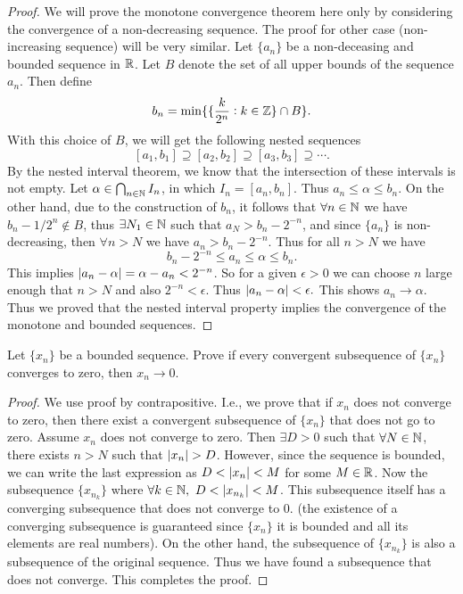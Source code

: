 \begin{proof}
	We will prove the monotone convergence theorem here only by considering the convergence of a non-decreasing sequence. The proof for other case (non-increasing sequence) will be very similar. Let $\{a_n\}$ be a non-deceasing and bounded sequence in $\mathbb{R}$. Let $B$ denote the set of all upper bounds of the sequence $a_n$. Then define
	\[ b_n = \min\{\{\frac{k}{2^n}: k\in\mathbb{Z}\} \cap B \}. \]
	With this choice of $B$, we will get the following nested sequences
	\[ [a_1, b_1] \supseteq [a_2, b_2] \supseteq [a_3,b_3] \supseteq \cdots. \]
	By the nested interval theorem, we know that the intersection of these intervals is not empty. Let $\alpha \in \bigcap_{n\in\mathbb{N}} I_n$, in which $I_n = [a_n,b_n]$. Thus $a_n \leq \alpha \leq b_n$. On the other hand, due to the construction of $b_n$, it follows that $\forall n\in \mathbb{N}$ we have $b_n - 1/2^{n} \notin B$, thus $\exists N_1 \in \mathbb{N}$ such that $a_N > b_n - 2^{-n}$, and since $\{a_n\}$ is non-decreasing, then $\forall n>N$ we have $a_n > b_n-2^{-n}$. Thus for all $n>N$ we have
	\[ b_n - 2^{-n} \leq a_n \leq \alpha \leq b_n. \]
	This implies $|a_n - \alpha| = \alpha - a_n < 2^{-n}$. So for a given $\epsilon>0$ we can choose $n$ large enough that $n>N$ and also $2^{-n} < \epsilon$. Thus $|a_n - \alpha| < \epsilon.$ This shows $a_n \to \alpha$. Thus we proved that the nested interval property implies the convergence of the monotone and bounded sequences. 
\end{proof}


\begin{problem}
	Let $\{x_n\}$ be a bounded sequence. Prove if every convergent subsequence of $\{x_n\}$ converges to zero, then $x_n \to 0$.
\end{problem}
\begin{proof}
	We use proof by contrapositive. I.e., we prove that if $x_n$ does not converge to zero, then there exist a convergent subsequence of $\{x_n\}$ that does not go to zero. Assume $x_n$ does not converge to zero. Then $\exists D>0$ such that $\forall N\in\mathbb{N}$, there exists $n>N$ such that $|x_n| > D$. However, since the sequence is bounded, we can write the last expression as $D < |x_n| < M$ for some $M\in \mathbb{R}$. Now the subsequence $\{x_{n_k}\}$ where $\forall k \in\mathbb{N},\ D< |x_{n_k}|<M$. This subsequence itself has a converging subsequence that does not converge to $0$. (the existence of a converging subsequence is guaranteed since 
	$\{x_n\}$ it is bounded and all its elements are real numbers). On the other hand, the subsequence of $\{x_{n_k}\}$ is also a subsequence of the original sequence. Thus we have found a subsequence that does not converge. This completes the proof.
 \end{proof}
 
